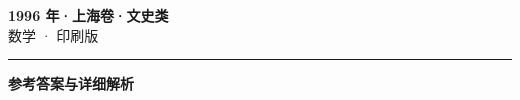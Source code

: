 \documentclass[zihao=5, a4paper]{ctexart}
\begin{document}
\begin{center}
  {\Large\bfseries 1996 年·上海卷·文史类}\\[4pt]
  {\large 数学 · 印刷版}
\end{center}
\medskip
{}

\par\bigskip\hrule\bigskip
{}
\begin{center}{\large\bfseries 参考答案与详细解析}\end{center}
\smallskip

\end{document}

